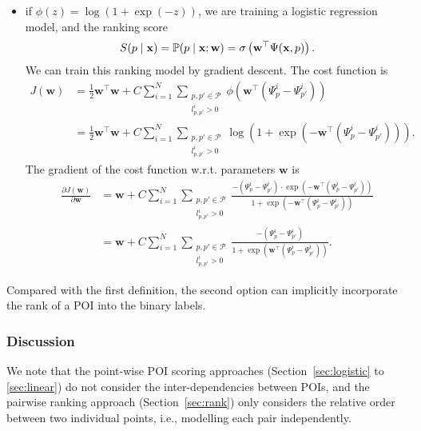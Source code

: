 \begin{itemize}
\item if $\phi(z) = \log(1 + \exp(-z))$, we are training a logistic regression model, and the ranking score
      \begin{equation*}
      S(p \mid \mathbf{x})= \mathbb{P}(p \mid \mathbf{x}; \mathbf{w}) = \sigma \left(\mathbf{w}^\top \Psi(\mathbf{x}, p) \right).
      \end{equation*}
      We can train this ranking model by gradient descent. The cost function is
      \begin{align*}
      J(\mathbf{w})
      &= \frac{1}{2} \mathbf{w}^\top \mathbf{w} +  
         C \sum_{i=1}^N \sum_{\substack{p, p' \in \mathcal{P} \\ l_{p,p'}^i >0}} \phi \left( \mathbf{w}^\top (\Psi_p^i - \Psi_{p'}^i) \right) \\
      &= \frac{1}{2} \mathbf{w}^\top \mathbf{w} + C \sum_{i=1}^N \sum_{\substack{p, p' \in \mathcal{P} \\ l_{p,p'}^i >0}} 
         \log\left(1 + \exp\left( -\mathbf{w}^\top (\Psi_p^i - \Psi_{p'}^i) \right)\right).
      \end{align*}
      The gradient of the cost function w.r.t. parameters $\mathbf{w}$ is
      \begin{align*}
      \frac{\partial J(\mathbf{w})}{\partial \mathbf{w}} 
      &= \mathbf{w} + C \sum_{i=1}^N \sum_{\substack{p, p' \in \mathcal{P} \\ l_{p,p'}^i >0}}
         \frac{-(\Psi_p^i - \Psi_{p'}^i) \cdot \exp\left( -\mathbf{w}^\top (\Psi_p^i - \Psi_{p'}^i) \right)}
              {1 + \exp\left( -\mathbf{w}^\top (\Psi_p^i - \Psi_{p'}^i) \right)} \\
      &= \mathbf{w} + C \sum_{i=1}^N \sum_{\substack{p, p' \in \mathcal{P} \\ l_{p,p'}^i >0}}
         \frac{-(\Psi_p^i - \Psi_{p'}^i)}{1 + \exp\left( \mathbf{w}^\top (\Psi_p^i - \Psi_{p'}^i) \right)}.
      \end{align*} 
\end{itemize}

      
Compared with the first definition, the second option can implicitly incorporate the rank of a POI into the binary labels.



\subsubsection{Discussion}

We note that the point-wise POI scoring approaches (Section~\ref{sec:logistic} to \ref{sec:linear}) do not consider the inter-dependencies between POIs,
and the pairwise ranking approach (Section~\ref{sec:rank}) only considers the relative order between two individual points,
i.e., modelling each pair independently.



